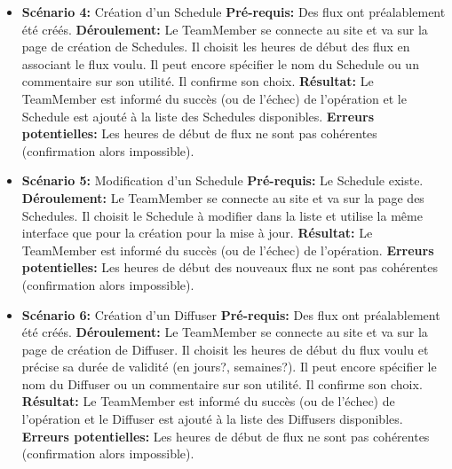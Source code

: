 \documentclass[french]{article}
\begin{document}
\begin{appendices}
\begin{itemize}
			\item \textbf{Scénario 4:} Création d'un Schedule\newline
			\textbf{Pré-requis:} Des flux ont préalablement été créés.\newline
			\textbf{Déroulement:} Le TeamMember se connecte au site et va sur la page de création de Schedules. Il choisit les heures de début des flux en associant le flux voulu. Il peut encore spécifier le nom du Schedule ou un commentaire sur son utilité. Il confirme son choix. \newline
			\textbf{Résultat:} Le TeamMember est informé du succès (ou de l'échec) de l'opération et le Schedule est ajouté à la liste des Schedules disponibles.\newline
			\textbf{Erreurs potentielles:} Les heures de début de flux ne sont pas cohérentes (confirmation alors impossible). \newline
			
			\item \textbf{Scénario 5:} Modification d'un Schedule \newline
			\textbf{Pré-requis:} Le Schedule existe.\newline
			\textbf{Déroulement:} Le TeamMember se connecte au site et va sur la page des Schedules. Il choisit le Schedule à modifier dans la liste et utilise la même interface que pour la création pour la mise à jour. \newline
			\textbf{Résultat:} Le TeamMember est informé du succès (ou de l'échec) de l'opération.\newline
			\textbf{Erreurs potentielles:} Les heures de début des nouveaux flux ne sont pas cohérentes (confirmation alors impossible). \newline
			
			\item \textbf{Scénario 6:} Création d'un Diffuser\newline
			\textbf{Pré-requis:} Des flux ont préalablement été créés.\newline
			\textbf{Déroulement:} Le TeamMember se connecte au site et va sur la page de création de Diffuser. Il choisit les heures de début du flux voulu et précise sa durée de validité (en jours?, semaines?). Il peut encore spécifier le nom du Diffuser ou un commentaire sur son utilité. Il confirme son choix. \newline
			\textbf{Résultat:} Le TeamMember est informé du succès (ou de l'échec) de l'opération et le Diffuser est ajouté à la liste des Diffusers disponibles.\newline
			\textbf{Erreurs potentielles:} Les heures de début de flux ne sont pas cohérentes (confirmation alors impossible). \newline
			

\end{itemize}
\end{appendices}
\end{document}
